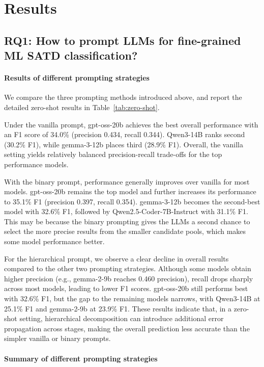 \documentclass[acmsmall,screen,review,anonymous]{acmart}
\begin{document}
\section{Results}\label{sec:results}


\subsection{RQ1: How to prompt LLMs for fine-grained ML SATD classification?}

\paragraph{Results of different prompting strategies} We compare the three prompting methods introduced above, and report the detailed zero-shot results in Table~\ref{tab:zero-shot}.

Under the vanilla prompt, gpt-oss-20b achieves the best overall performance with an F1 score of 34.0\% (precision 0.434, recall 0.344). Qwen3-14B ranks second (30.2\% F1), while gemma-3-12b places third (28.9\% F1). Overall, the vanilla setting yields relatively balanced precision-recall trade-offs for the top performance models.


With the binary prompt, performance generally improves over vanilla for most models. gpt-oss-20b remains the top model and further increases its performance to 35.1\% F1 (precision 0.397, recall 0.354). gemma-3-12b becomes the second-best model with 32.6\% F1, followed by Qwen2.5-Coder-7B-Instruct with 31.1\% F1. This may be because the binary prompting gives the LLMs a second chance to select the more precise results from the smaller candidate pools, which makes some model performance better.


For the hierarchical prompt, we observe a clear decline in overall results compared to the other two prompting strategies. Although some models obtain higher precision (e.g., gemma-2-9b reaches 0.460 precision), recall drops sharply across most models, leading to lower F1 scores. gpt-oss-20b still performs best with 32.6\% F1, but the gap to the remaining models narrows, with Qwen3-14B at 25.1\% F1 and gemma-2-9b at 23.9\% F1. These results indicate that, in a zero-shot setting, hierarchical decomposition can introduce additional error propagation across stages, making the overall prediction less accurate than the simpler vanilla or binary prompts.


\paragraph{Summary of different prompting strategies}
\end{document}
